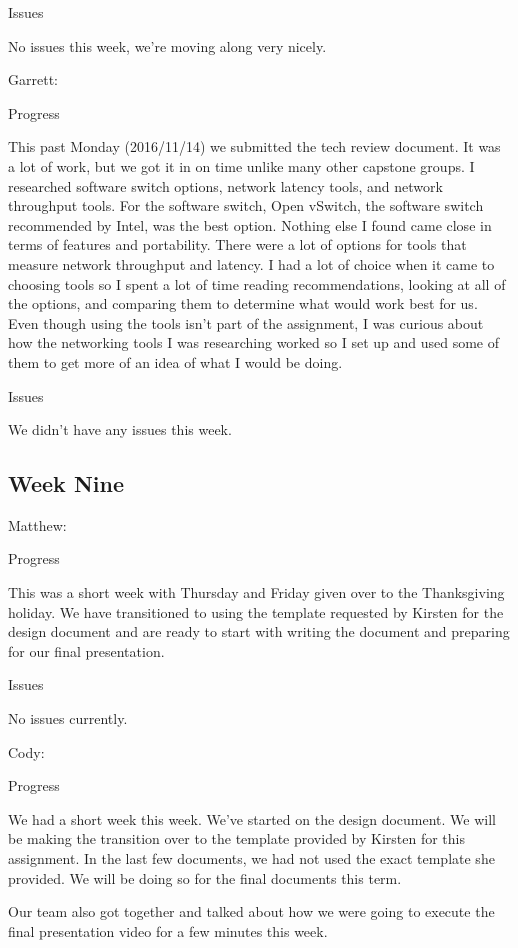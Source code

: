 \documentclass[10pt,onecolumn,journal,draftclsnofoot]{IEEEtran}
\begin{document}
Issues

No issues this week, we're moving along very nicely.

Garrett:

Progress

This past Monday (2016/11/14) we submitted the tech review document. It was a
lot of work, but we got it in on time unlike many other capstone groups. I
researched software switch options, network latency tools, and network
throughput tools. For the software switch, Open vSwitch, the software switch
recommended by Intel, was the best option. Nothing else I found came close in
terms of features and portability. There were a lot of options for tools that
measure network throughput and latency. I had a lot of choice when it came to
choosing tools so I spent a lot of time reading recommendations, looking at all
of the options, and comparing them to determine what would work best for us.
Even though using the tools isn't part of the assignment, I was curious about
how the networking tools I was researching worked so I set up and used some of
them to get more of an idea of what I would be doing.

Issues

We didn't have any issues this week.

\subsection{Week Nine}

Matthew:

Progress

This was a short week with Thursday and Friday given over to the Thanksgiving
holiday. We have transitioned to using the template requested by Kirsten for the
design document and are ready to start with writing the document and preparing
for our final presentation.

Issues

No issues currently.

Cody:

Progress

We had a short week this week. We've started on the design document. We will be
making the transition over to the template provided by Kirsten for this
assignment. In the last few documents, we had not used the exact template she
provided. We will be doing so for the final documents this term.

Our team also got together and talked about how we were going to execute the
final presentation video for a few minutes this week.
\end{document}
